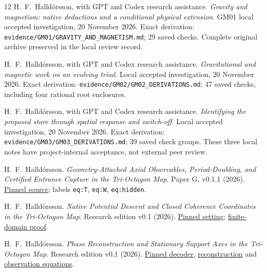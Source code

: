 \begin{thebibliography}{12}
H.~F.~Halldórsson, with GPT and Codex research assistance.
\emph{Gravity and magnetism: native deductions and a conditional physical extension}.
GM01 local accepted investigation, 20 November 2026.
Exact derivation: \texttt{evidence/GM01/GRAVITY\_AND\_MAGNETISM.md};
29 saved checks. Complete original archive preserved in the local review record.

H.~F.~Halldórsson, with GPT and Codex research assistance.
\emph{Gravitational and magnetic work on an evolving triad}.
Local accepted investigation, 20 November 2026.
Exact derivation: \texttt{evidence/GM02/GM02\_DERIVATIONS.md};
47 saved checks, including four rational root enclosures.

H.~F.~Halldórsson, with GPT and Codex research assistance.
\emph{Identifying the proposed store through spatial response and switch-off}.
Local accepted investigation, 20 November 2026.
Exact derivation: \texttt{evidence/GM03/GM03\_DERIVATIONS.md};
39 saved check groups. These three local notes have project-internal acceptance, not external peer review.

H.~F.~Halldórsson.
\emph{Geometry-Attached Axial Observables, Period-Doubling, and Certified Entrance Capture in the Tri-Octagon Map}.
Paper G, v0.1.1 (2026).
\href{https://github.com/pzychozen/trioctagon-physics/blob/ca22652dc000ca2b16419c1af4167918eab1ae94/papers/PAPER_G/v0.1.1/source/paper_g.tex}{Pinned source};
labels \texttt{eq:T}, \texttt{eq:W}, \texttt{eq:hidden}.

H.~F.~Halldórsson.
\emph{Native Potential Descent and Closed Coherence Coordinates in the Tri-Octagon Map}.
Research edition v0.1 (2026).
\href{https://github.com/pzychozen/trioctagon-physics/blob/ca22652dc000ca2b16419c1af4167918eab1ae94/papers/NATIVE_POTENTIAL_AND_CLOSED_COHERENCE/publication/v0.1/manuscript/setting.tex}{Pinned setting};
\href{https://github.com/pzychozen/trioctagon-physics/blob/ca22652dc000ca2b16419c1af4167918eab1ae94/papers/NATIVE_POTENTIAL_AND_CLOSED_COHERENCE/publication/v0.1/manuscript/finite.tex}{finite-domain proof}.

H.~F.~Halldórsson.
\emph{Phase Reconstruction and Stationary Support Axes in the Tri-Octagon Map}.
Research edition v0.1 (2026).
\href{https://github.com/pzychozen/trioctagon-physics/blob/ca22652dc000ca2b16419c1af4167918eab1ae94/papers/PHASE_RECONSTRUCTION_AND_STATIONARY_SUPPORT_AXES/publication/v0.1/manuscript/spatial.tex}{Pinned decoder},
\href{https://github.com/pzychozen/trioctagon-physics/blob/ca22652dc000ca2b16419c1af4167918eab1ae94/papers/PHASE_RECONSTRUCTION_AND_STATIONARY_SUPPORT_AXES/publication/v0.1/manuscript/reconstruction.tex}{reconstruction}
and
\href{https://github.com/pzychozen/trioctagon-physics/blob/ca22652dc000ca2b16419c1af4167918eab1ae94/papers/PHASE_RECONSTRUCTION_AND_STATIONARY_SUPPORT_AXES/publication/v0.1/manuscript/observations.tex}{observation equations}.


\end{thebibliography}
